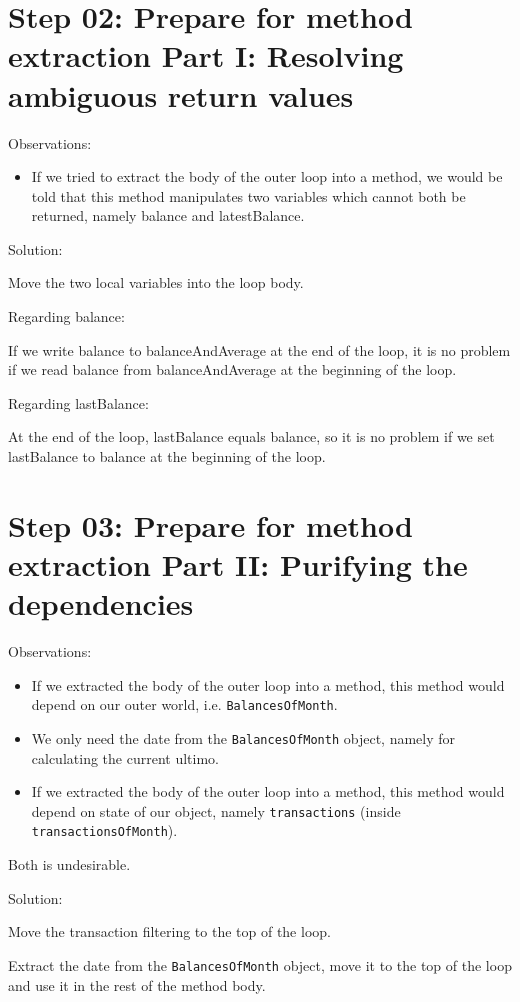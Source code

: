 \documentclass[a4paper,fleqn,titlepage,11pt]{article}
\begin{document}
\section*{Step 02: Prepare for method extraction Part I: Resolving ambiguous return values}

Observations:
\begin{itemize}
\item If we tried to extract the body of the outer loop into a method, we would be told that this method manipulates two variables which cannot both be returned, namely balance and latestBalance.
\end{itemize}

Solution:

Move the two local variables into the loop body.

Regarding balance:

If we write balance to balanceAndAverage at the end of the loop, it is no problem if we read balance from balanceAndAverage at the beginning of the loop.

Regarding lastBalance:

At the end of the loop, lastBalance equals balance, so it is no problem if we set lastBalance to balance at the beginning of the loop.

\section*{Step 03: Prepare for method extraction Part II: Purifying the dependencies}

Observations:
\begin{itemize}
\item If we extracted the body of the outer loop into a method, this method would depend on our outer world, i.e. \texttt{BalancesOfMonth}.
\item We only need the date from the \texttt{BalancesOfMonth} object, namely for calculating the current ultimo.
\item If we extracted the body of the outer loop into a method, this method would depend on state of our object, namely \texttt{transactions} (inside \texttt{transactionsOfMonth}).
\end{itemize}

Both is undesirable.

Solution:

Move the transaction filtering to the top of the loop.

Extract the date from the \texttt{BalancesOfMonth} object, move it to the top of the loop and use it in the rest of the method body.
\end{document}
